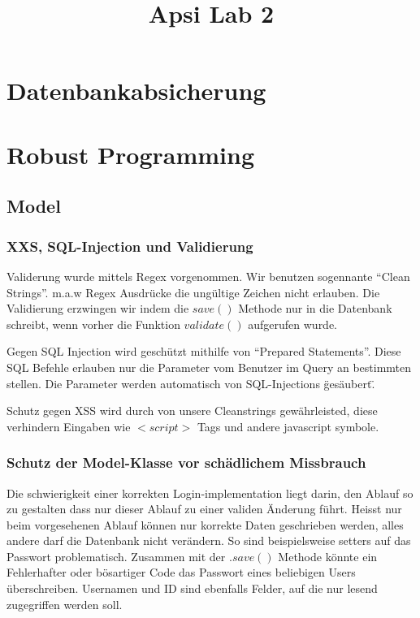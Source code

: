 \documentclass[10pt]{scrartcl}
\title{ %
Apsi
\vspace{0.2cm}
\Large Lab 2 }
\begin{document}
 \maketitle
 \thispagestyle{firststyle}
 \pagestyle{firststyle}
 \begin{abstract}
 \begin{center}

 \end{center}
 \vspace{0.5cm}
\hrulefill
\end{abstract}

 \pagestyle{documentstyle}
 \tableofcontents
 \pagebreak
\section{Datenbankabsicherung}

 
 
\section{Robust Programming}

\subsection{Model}
\subsubsection{XXS, SQL-Injection und Validierung}
Validerung wurde mittels Regex vorgenommen. Wir benutzen sogennante ``Clean Strings''. m.a.w Regex Ausdrücke die ungültige Zeichen nicht erlauben. Die Validierung erzwingen wir indem die $save()$ Methode nur in die Datenbank schreibt, wenn vorher die Funktion $validate()$ aufgerufen wurde.

Gegen SQL Injection wird geschützt mithilfe von ``Prepared Statements''. Diese SQL Befehle erlauben nur die Parameter 
vom Benutzer im Query an bestimmten stellen. Die Parameter werden automatisch von SQL-Injections \"gesäubert\".
 
Schutz gegen XSS wird durch von unsere Cleanstrings gewährleisted, diese verhindern Eingaben wie $<script>$ Tags und andere javascript symbole.

\subsubsection{Schutz der Model-Klasse vor schädlichem Missbrauch}
Die schwierigkeit einer korrekten Login-implementation liegt darin, den Ablauf so zu gestalten dass nur dieser Ablauf zu einer validen Änderung führt. Heisst nur beim vorgesehenen Ablauf können nur korrekte Daten geschrieben werden, alles andere darf die Datenbank nicht verändern. So sind beispielsweise setters auf das Passwort problematisch. Zusammen mit der $.save()$ Methode könnte ein Fehlerhafter oder bösartiger Code das Passwort eines beliebigen Users überschreiben. Usernamen und ID sind ebenfalls Felder, auf die nur lesend zugegriffen werden soll.
\end{document}
